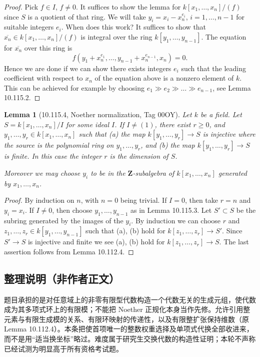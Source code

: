 \documentclass[UTF8,11pt]{ctexart}
\newtheorem*{lemma}{Lemma}
\theoremstyle{definition}
\begin{document}
\begin{proof}
Pick $f\in I$, $f\neq0$. It suffices to show the lemma for $k[x_1,\ldots,x_n]/(f)$ since $S$ is a quotient of that ring. We will take $y_i=x_i-x_n^{e_i}$, $i=1,\ldots,n-1$ for suitable integers $e_i$. When does this work? It suffices to show that $\overline{x_n}\in k[x_1,\ldots,x_n]/(f)$ is integral over the ring $k[y_1,\ldots,y_{n-1}]$. The equation for $\overline{x_n}$ over this ring is
\[
f(y_1+x_n^{e_1},\ldots,y_{n-1}+x_n^{e_{n-1}},x_n)=0.
\]
Hence we are done if we can show there exists integers $e_i$ such that the leading coefficient with respect to $x_n$ of the equation above is a nonzero element of $k$. This can be achieved for example by choosing $e_1\gg e_2\gg\ldots\gg e_{n-1}$, see Lemma 10.115.2.
\end{proof}
\begin{lemma}[10.115.4, Noether normalization, Tag 00OY]
Let $k$ be a field. Let $S=k[x_1,\ldots,x_n]/I$ for some ideal $I$. If $I\neq(1)$, there exist $r\geq0$, and $y_1,\ldots,y_r\in k[x_1,\ldots,x_n]$ such that (a) the map $k[y_1,\ldots,y_r]\to S$ is injective where the source is the polynomial ring on $y_1,\ldots,y_r$, and (b) the map $k[y_1,\ldots,y_r]\to S$ is finite. In this case the integer $r$ is the dimension of $S$.

Moreover we may choose $y_i$ to be in the $\mathbf Z$-subalgebra of $k[x_1,\ldots,x_n]$ generated by $x_1,\ldots,x_n$.
\end{lemma}
\begin{proof}
By induction on $n$, with $n=0$ being trivial. If $I=0$, then take $r=n$ and $y_i=x_i$. If $I\neq0$, then choose $y_1,\ldots,y_{n-1}$ as in Lemma 10.115.3. Let $S'\subset S$ be the subring generated by the images of the $y_i$. By induction we can choose $r$ and $z_1,\ldots,z_r\in k[y_1,\ldots,y_{n-1}]$ such that (a), (b) hold for $k[z_1,\ldots,z_r]\to S'$. Since $S'\to S$ is injective and finite we see (a), (b) hold for $k[z_1,\ldots,z_r]\to S$. The last assertion follows from Lemma 10.112.4.
\end{proof}

\subsection*{整理说明（非作者正文）}
题目承担的是对任意域上的非零有限型代数构造一个代数无关的生成元组，使代数成为其多项式环上的有限模；不能把 Noether 正规化本身当作先修。允许引用整元素与有限生成模的关系、有限环映射的传递性，以及有限整扩张保持维数（原 Lemma 10.112.4）。本条把使首项唯一的整数权重选择及单项式代换全部收进来，而不是用“适当换坐标”略过。难度属于研究生交换代数的构造性证明；本轮不声称已经试测为明显高于所有资格考试题。
\end{document}
